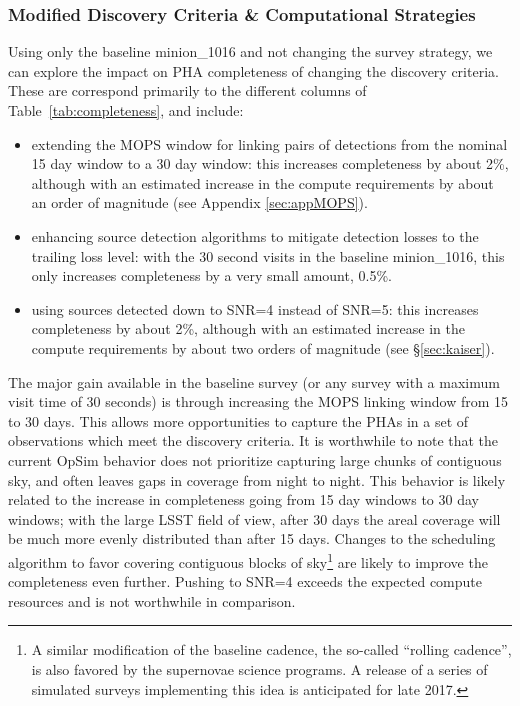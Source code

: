 \subsubsection{Modified Discovery Criteria \& Computational Strategies}


Using only the baseline minion\_1016 and not changing the survey strategy, we can explore the impact on PHA completeness of changing the discovery criteria. These are correspond primarily to the different columns of Table~\ref{tab:completeness}, and include:

\begin{itemize}
\item extending the MOPS window for linking pairs of detections from the nominal 15 day window to a 30 day window: this increases completeness by about 2\%, although with an estimated increase in the compute requirements by about an order of magnitude (see Appendix \ref{sec:appMOPS}).
\item enhancing source detection algorithms to mitigate detection losses to the trailing loss level: with the 30 second visits in the baseline minion\_1016, this only increases completeness by a very small amount, 0.5\%.
\item using sources detected down to SNR=4 instead of SNR=5: this increases completeness by about 2\%, although with an estimated increase in the compute requirements by about two orders of magnitude (see \S\ref{sec:kaiser}).
\end{itemize}

The major gain available in the baseline survey (or any survey with a maximum visit time of 30 seconds) is through increasing the MOPS linking window from 15 to 30 days. This allows more opportunities to capture the PHAs in a set of observations which meet the discovery criteria. It is worthwhile to note that the current OpSim behavior does not prioritize capturing large chunks of contiguous sky, and often leaves gaps in coverage from night to night. This behavior is likely related to the increase in completeness going from 15 day windows to 30 day windows; with the large LSST field of view, after 30 days the areal coverage will be much more evenly distributed than after 15 days. Changes to the scheduling algorithm to favor covering contiguous blocks of sky\footnote{A similar modification of
the baseline cadence, the so-called ``rolling cadence'', is also favored by the supernovae science programs. A release of a series of simulated surveys implementing this idea is anticipated for late 2017.} are likely to improve the completeness even further.  Pushing to SNR=4 exceeds the expected compute resources and is not worthwhile in comparison.


